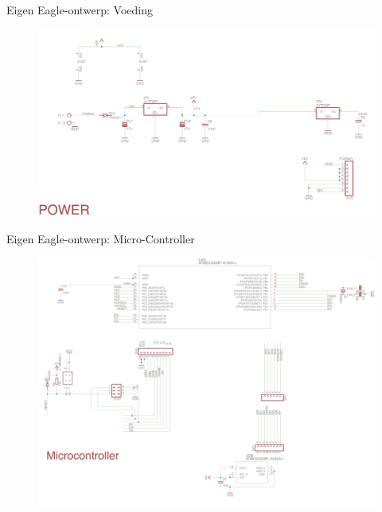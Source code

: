 \documentclass[t,12pt,english
\ifx\beamermode\undefined\else,\beamermode\fi
]{beamer}
\begin{document}
\begin{frame}{Eigen Eagle-ontwerp: Voeding}
\begin{figure}[H]
	\centering
	\includegraphics[width=\textwidth,height=0.8\textheight,keepaspectratio]{eigenschematicdeel2.png}
\end{figure}
\end{frame}

\begin{frame}{Eigen Eagle-ontwerp: Micro-Controller}
\begin{figure}[H]
	\centering
	\includegraphics[width=\textwidth,height=0.8\textheight,keepaspectratio]{eigenschematicdeel3.png}
\end{figure}
\end{frame}
\end{document}
